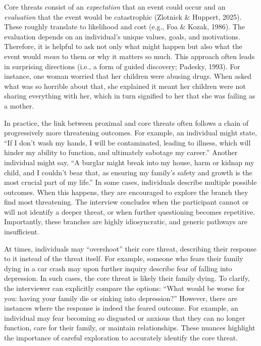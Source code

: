 \documentclass[
  man,floatsintext]{apa7}
\begin{document}
Core threats consist of an \emph{expectation} that an event could occur and an \emph{evaluation} that the event would be catastrophic (Zlotnick \& Huppert, 2025).
These roughly translate to likelihood and cost (e.g., Foa \& Kozak, 1986).
The evaluation depends on an individual's unique values, goals, and motivations.
Therefore, it is helpful to ask not only what might happen but also what the event would \emph{mean} to them or why it matters so much.
This approach often leads in surprising directions (i.e., a form of guided discovery; Padesky, 1993).
For instance, one woman worried that her children were abusing drugs.
When asked what was so horrible about that, she explained it meant her children were not sharing everything with her, which in turn signified to her that she was failing as a mother.

In practice, the link between proximal and core threats often follows a chain of progressively more threatening outcomes.
For example, an individual might state, ``If I don't wash my hands, I will be contaminated, leading to illness, which will hinder my ability to function, and ultimately sabotage my career.''
Another individual might say, ``A burglar might break into my house, harm or kidnap my child, and I couldn't bear that, as ensuring my family's safety and growth is the most crucial part of my life.''
In some cases, individuals describe multiple possible outcomes.
When this happens, they are encouraged to explore the branch they find most threatening.
The interview concludes when the participant cannot or will not identify a deeper threat, or when further questioning becomes repetitive.
Importantly, these branches are highly idiosyncratic, and generic pathways are insufficient.

At times, individuals may ``overshoot'' their core threat, describing their response to it instead of the threat itself.
For example, someone who fears their family dying in a car crash may upon further inquiry describe fear of falling into depression.
In such cases, the core threat is likely their family dying.
To clarify, the interviewer can explicitly compare the options: ``What would be worse for you: having your family die or sinking into depression?''
However, there are instances where the response is indeed the feared outcome.
For example, an individual may fear becoming so disgusted or anxious that they can no longer function, care for their family, or maintain relationships.
These nuances highlight the importance of careful exploration to accurately identify the core threat.
\end{document}
